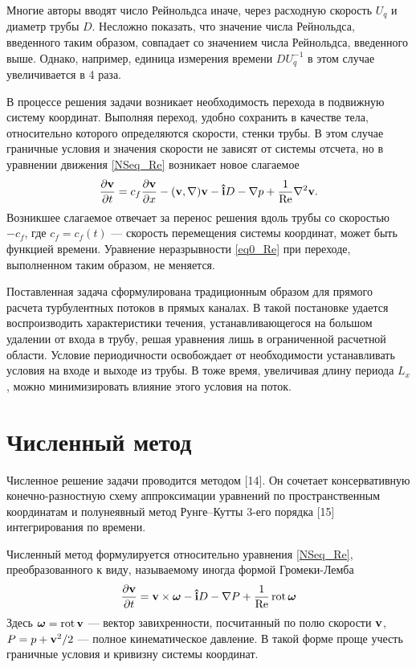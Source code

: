Многие авторы вводят число Рейнольдса иначе, через расходную скорость $U_q$ и диаметр трубы $D$. Несложно показать, что значение числа Рейнольдса, введенного таким образом, совпадает со значением числа Рейнольдса, введенного выше. Однако, например, единица измерения времени $DU_q^{-1}$ в этом случае увеличивается в 4 раза.

В процессе решения задачи возникает необходимость перехода в подвижную систему координат. Выполняя переход, удобно сохранить в качестве тела, относительно которого определяются скорости, стенки трубы. В этом случае граничные условия и значения скорости не зависят от системы отсчета, но в уравнении движения \eqref{NSeq_Re} возникает новое слагаемое
\begin{equation}\label{NSeq_cf}
\frac{\partial \mathbf{v}}{\partial t} = c_f \frac{\partial \mathbf{v}}{\partial x} - (\mathbf{v}, \nabla) \mathbf{v} - \mathbf{\hat{i}} D - \nabla p + \frac{1}{\operatorname{Re}} \nabla^2 \mathbf{v}. 
\end{equation}
Возникшее слагаемое отвечает за перенос решения вдоль трубы со скоростью $-c_f$, где $c_f = c_f(t)$ --- скорость перемещения системы координат, может быть функцией времени. Уравнение неразрывности \eqref{eq0_Re} при переходе, выполненном таким образом, не меняется. 


Поставленная задача сформулирована традиционным образом для прямого расчета турбулентных потоков в прямых каналах. В такой постановке удается воспроизводить характеристики течения, устанавливающегося на большом удалении от входа в трубу, решая уравнения лишь в ограниченной расчетной области. Условие периодичности освобождает от необходимости устанавливать условия на входе и выходе из трубы. В тоже время, увеличивая длину периода $L_x$, можно минимизировать влияние этого условия на поток. 

 
\section{Численный метод}

Численное решение задачи проводится методом [14]. Он сочетает консервативную конечно-разностную схему аппроксимации уравнений по пространственным координатам и полунеявный метод Рунге--Кутты 3-его порядка [15] интегрирования по времени.


Численный метод формулируется относительно уравнения \eqref{NSeq_Re}, преобразованного к виду, называемому иногда формой Громеки-Лемба
\begin{equation}\label{NSeq_om}
\frac{\partial \mathbf{v}}{\partial t} = \mathbf{v} \times \mbox{\boldmath$\omega$} - \mathbf{\hat{i}} D - \nabla P + \frac{1}{\operatorname{Re}} \operatorname{rot} \mbox{\boldmath$\omega$}
\end{equation}
Здесь $\mbox{\boldmath$\omega$} = \operatorname{rot} \mathbf{v}$ --- вектор завихренности, посчитанный по полю скорости $\mathbf{v}$, $P = p + \mathbf{v}^2/2$ --- полное кинематическое давление. В такой форме проще учесть граничные условия и кривизну системы координат. 



